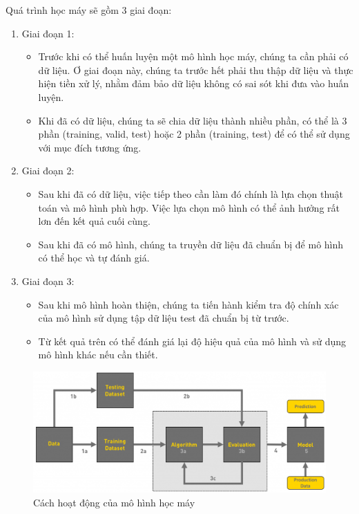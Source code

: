 Quá trình học máy sẽ gồm 3 giai đoạn\cite{webpage2}:
\begin{enumerate}
    \item Giai đoạn 1:
          \begin{itemize}
              \item Trước khi có thể huấn luyện một mô hình học máy, chúng ta cần phải có dữ liệu. Ơ giai đoạn này, chúng ta trước hết phải thu thập dữ liệu và thực hiện tiền xử lý, nhằm đảm bảo dữ liệu không có sai sót khi đưa vào huấn luyện.
              \item Khi đã có dữ liệu, chúng ta sẽ chia dữ liệu thành nhiều phần, có thể là 3 phần (training, valid, test) hoặc 2 phần (training, test) để có thể sử dụng với mục đích tương ứng.
          \end{itemize}
    \item Giai đoạn 2:
          \begin{itemize}
              \item Sau khi đã có dữ liệu, việc tiếp theo cần làm đó chính là lựa chọn thuật toán và mô hình phù hợp. Việc lựa chọn mô hình có thể ảnh hưởng rất lơn đến kết quả cuối cùng.
              \item Sau khi đã có mô hình, chúng ta truyền dữ liệu đã chuẩn bị để mô hình có thể học và tự đánh giá.
          \end{itemize}
    \item Giai đoạn 3:
          \begin{itemize}
              \item Sau khi mô hình hoàn thiện, chúng ta tiến hành kiểm tra độ chính xác của mô hình sử dụng tập dữ liệu test đã chuẩn bị từ trước.
              \item Từ kết quả trên có thể đánh giá lại độ hiệu quả của mô hình và sử dụng mô hình khác nếu cần thiết.
          \end{itemize}
\end{enumerate}
\begin{figure}[htb]
    \centering
    \includegraphics[width=\textwidth]{image/machine-learning-model.png}
    \caption[Cách hoạt động của mô hình học máy]{Cách hoạt động của mô hình học máy\footnotemark}
    \label{figure:machine-learning-model}
\end{figure}


